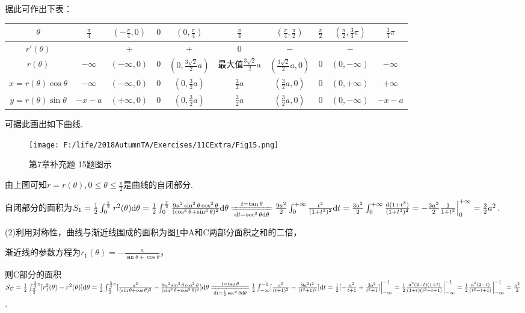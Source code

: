 \documentclass[12pt,UTF8]{ctexart}
\begin{document}
\begin{enumerate}
据此可作出下表：
\begin{table}[H]
\centering
\begin{tabular}{c|c|c|c|c|c|c|c|c|c}
\hline
$\theta$ & $\frac\pi4$ & $(-\frac\pi4,0)$ & $0$ & $(0,\frac\pi4)$ & $\frac\pi4$ & $(\frac\pi4,\frac\pi2)$ & $\frac\pi2$ & $(\frac\pi2,\frac34\pi)$ & $\frac34\pi$\\
\hline
$r'(\theta)$ &  & $+$ &  & $+$ & $0$ & $-$ &  & $-$ & \\
\hline
$r(\theta)$ & $-\infty$ & $(-\infty,0)$ & $0$ & $(0,\frac{3\sqrt2}2a)$ & 最大值$\frac{3\sqrt2}2a$ & $(\frac{3\sqrt2}2a,0)$ & $0$ & $(0,-\infty)$ & $-\infty $\\
\hline
$x=r(\theta)\cos\theta$ & $-\infty$ & $(-\infty,0)$ & $0$ & $(0,\frac32a)$ & $\frac32a$ & $(\frac32a,0)$ & $0$ & $(0,+\infty)$ & $+\infty$\\
\hline
$y=r(\theta)\sin\theta$ & $-x-a$ & $(+\infty,0)$ & $0$ & $(0,\frac32a)$ & $\frac32a$ & $(\frac32a,0)$ & $0$ & $(0,-\infty)$ & $-x-a$\\
\hline
\end{tabular}
\end{table}
可据此画出如下曲线.
\begin{figure}[H]
\begin{center}
\texttt{[image: F:/life/2018AutumnTA/Exercises/11CExtra/Fig15.png]}
\end{center}
\caption{第7章补充题 15题图示}
\label{15}
\end{figure}

由上图可知$r=r(\theta),0\leq\theta\leq\frac\pi2$是曲线的自闭部分. 

自闭部分的面积为$S_1=\frac12\int_0^{\frac\pi2}r^2(\theta)\mathrm d\theta=\frac12\int_0^{\frac\pi2}\frac{9a^2\sin^2\theta\cos^2\theta}{(\cos^3\theta+\sin^3\theta)^2}\mathrm d\theta\xlongequal[\mathrm dt=\sec^2\theta\mathrm d\theta]{t=\tan\theta}\frac{9a^2}2\int_0^{+\infty}\frac{t^2}{(1+t^3)^2}\mathrm dt\\
=\frac{3a^2}2\int_0^{+\infty}\frac{\mathrm d(1+t^3)}{(1+t^3)^2}=-\frac{3a^2}2\frac1{1+t^3}\Big|_0^{+\infty}=\frac32a^2$.

(2)利用对称性，曲线与渐近线围成的面积为图\ref{15}中A和C两部分面积之和的二倍，

渐近线的参数方程为$r_1(\theta)=-\frac a{\sin\theta+\cos\theta}$，

则C部分的面积$S_C=\frac12\int_{\frac\pi2}^{\frac34\pi}[r_1^2(\theta)-r^2(\theta)]\mathrm d\theta=\frac12\int_{\frac\pi2}^{\frac34\pi}[\frac{a^2}{(\sin\theta+\cos\theta)^2}-\frac{9a^2\sin^2\theta\cos^2\theta}{(\sin^3\theta+\cos^3\theta)^2}]\mathrm d\theta\\
\xlongequal[\mathrm dt=\frac12\sec^2\theta\mathrm d\theta]{t=\tan\theta}\frac12\int_{-\infty}^{-1}[\frac{a^2}{(t+1)^2}-\frac{9a^2t^2}{(t^3+1)^2}]\mathrm dt=\frac12[-\frac{a^2}{t+1}+\frac{3a^2}{t^3+1}]\Big|_{-\infty}^{-1}=\frac12\frac{a^2(2-t)(1+t)}{(1+t)(t^2-t+1)}\Big|_{-\infty}^{-1}=\frac12\frac{a^2(2-t)}{(t^2-t+1)}\Big|_{-\infty}^{-1}\\
=\frac{a^2}2$,


\end{enumerate}
\end{document}
